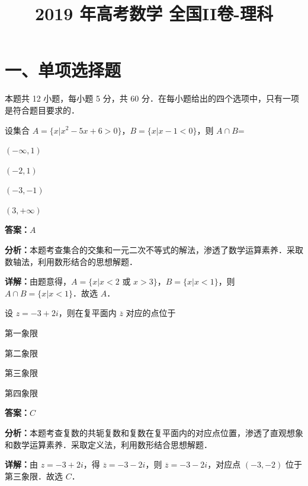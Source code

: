 ﻿\title{2019 年高考数学 全国II卷-理科}
\date{}
\maketitle

\section*{一、单项选择题}
本题共 12 小题，每小题 5 分，共 60 分．在每小题给出的四个选项中，只有一项是符合题目要求的．

\begin{question}[points=5]
设集合 $A=\{x|x^2-5x+6>0\}$，$B=\{x|x-1<0\}$，则 $A\cap B$=
\begin{choices}
  \item $(-\infty,1)$
  \item $(-2,1)$
  \item $(-3,-1)$
  \item $(3,+\infty)$
\end{choices}
\begin{solution}
\textbf{答案：}$A$

\textbf{分析：}本题考查集合的交集和一元二次不等式的解法，渗透了数学运算素养．采取数轴法，利用数形结合的思想解题．

\textbf{详解：}由题意得，$A=\{x|x<2 \text{ 或 } x>3\}$，$B=\{x|x<1\}$，则 $A\cap B=\{x|x<1\}$．故选 $A$．
\end{solution}
\end{question}

\begin{question}[points=5]
设 $z=-3+2i$，则在复平面内 $\overline{z}$ 对应的点位于
\begin{choices}
  \item 第一象限
  \item 第二象限
  \item 第三象限
  \item 第四象限
\end{choices}
\begin{solution}
\textbf{答案：}$C$

\textbf{分析：}本题考查复数的共轭复数和复数在复平面内的对应点位置，渗透了直观想象和数学运算素养．采取定义法，利用数形结合思想解题．

\textbf{详解：}由 $z=-3+2i$，得 $\overline{z}=-3-2i$，则 $\overline{z}=-3-2i$，对应点 $(-3,-2)$ 位于第三象限．故选 $C$．
\end{solution}
\end{question}

